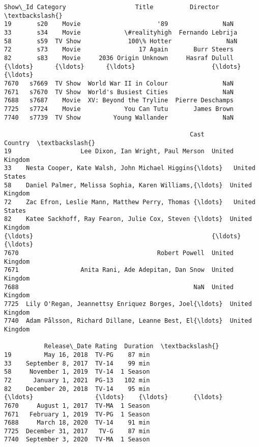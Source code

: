 \documentclass[11pt]{article}
\makeatletter
\newcommand{\boxspacing}{\kern\kvtcb@left@rule\kern\kvtcb@boxsep}
\newcommand{\prompt}[4]{
        {\ttfamily\llap{{\color{#2}[#3]:\hspace{3pt}#4}}\vspace{-\baselineskip}}
    }
\makeatother
\begin{document}
            \begin{tcolorbox}[breakable, size=fbox, boxrule=.5pt, pad at break*=1mm, opacityfill=0]
\prompt{Out}{outcolor}{36}{\boxspacing}
\begin{Verbatim}[commandchars=\\\{\}]
     Show\_Id Category                   Title          Director  \textbackslash{}
19       s20    Movie                     '89               NaN
33       s34    Movie            \#realityhigh  Fernando Lebrija
58       s59  TV Show             100\% Hotter               NaN
72       s73    Movie                17 Again       Burr Steers
82       s83    Movie     2036 Origin Unknown     Hasraf Dulull
{\ldots}      {\ldots}      {\ldots}                     {\ldots}               {\ldots}
7670   s7669  TV Show  World War II in Colour               NaN
7671   s7670  TV Show  World's Busiest Cities               NaN
7688   s7687    Movie  XV: Beyond the Tryline  Pierre Deschamps
7725   s7724    Movie            You Can Tutu       James Brown
7740   s7739  TV Show         Young Wallander               NaN

                                                   Cast         Country  \textbackslash{}
19                   Lee Dixon, Ian Wright, Paul Merson  United Kingdom
33    Nesta Cooper, Kate Walsh, John Michael Higgins{\ldots}   United States
58    Daniel Palmer, Melissa Sophia, Karen Williams,{\ldots}  United Kingdom
72    Zac Efron, Leslie Mann, Matthew Perry, Thomas {\ldots}   United States
82    Katee Sackhoff, Ray Fearon, Julie Cox, Steven {\ldots}  United Kingdom
{\ldots}                                                 {\ldots}             {\ldots}
7670                                      Robert Powell  United Kingdom
7671                 Anita Rani, Ade Adepitan, Dan Snow  United Kingdom
7688                                                NaN  United Kingdom
7725  Lily O'Regan, Jeannettsy Enriquez Borges, Joel{\ldots}  United Kingdom
7740  Adam Pålsson, Richard Dillane, Leanne Best, El{\ldots}  United Kingdom

           Release\_Date Rating  Duration  \textbackslash{}
19         May 16, 2018  TV-PG    87 min
33    September 8, 2017  TV-14    99 min
58     November 1, 2019  TV-14  1 Season
72      January 1, 2021  PG-13   102 min
82    December 20, 2018  TV-14    95 min
{\ldots}                 {\ldots}    {\ldots}       {\ldots}
7670     August 1, 2017  TV-MA  1 Season
7671   February 1, 2019  TV-PG  1 Season
7688     March 18, 2020  TV-14    91 min
7725  December 31, 2017   TV-G    87 min
7740  September 3, 2020  TV-MA  1 Season


\end{Verbatim}
\end{tcolorbox}
\end{document}
